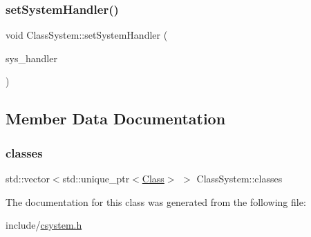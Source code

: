 \mbox{\label{classClassSystem_abe7eb559b5291d324cb055c89e80b180}} 
\subsubsection{\texorpdfstring{set\+System\+Handler()}{setSystemHandler()}}
{\footnotesize\ttfamily void Class\+System\+::set\+System\+Handler (\begin{DoxyParamCaption}\item[{\hyperlink{classSystemHandler}{System\+Handler} $\ast$}]{sys\+\_\+handler }\end{DoxyParamCaption})}



\subsection{Member Data Documentation}
\mbox{\label{classClassSystem_afdfbb54eb10abf323371cb9bb4f639a2}} 
\subsubsection{\texorpdfstring{classes}{classes}}
{\footnotesize\ttfamily std\+::vector$<$std\+::unique\+\_\+ptr$<$\hyperlink{classClass}{Class}$>$ $>$ Class\+System\+::classes}



The documentation for this class was generated from the following file\+:\begin{DoxyCompactItemize}
\item 
include/\hyperlink{csystem_8h}{csystem.\+h}\end{DoxyCompactItemize}
